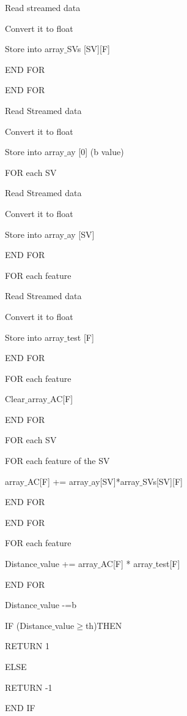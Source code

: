 \documentclass{article}
\begin{document}
\begin{itemize}
\begin{itemize}
        	\quad \quad Read streamed data
        
        	\quad \quad Convert it to float
        
        	\quad \quad Store into array$\_$SVs [SV][F]
        
        	\quad END FOR
        
        END FOR
        
        Read Streamed data
        
        Convert it to float
        
        Store into array$\_$ay [0] (b value)
        
        FOR each SV
        
            \quad Read Streamed data
        
            \quad Convert it to float
        
            \quad Store into array$\_$ay [SV]
        
        END FOR
        
        FOR each feature
        
            \quad Read Streamed data
        
            \quad Convert it to float
        
            \quad Store into array$\_$test [F] 
        
        END FOR
        
        FOR each feature
        
            \quad Clear$\_$array$\_$AC[F]
        
        END FOR
        
        FOR each SV
        
        	 \quad FOR each feature of the SV
        
        	 \quad \quad array$\_$AC[F] += array$\_$ay[SV]*array$\_$SVs[SV][F]
        
        	 \quad   END FOR
        
        END FOR
        
        FOR each feature
        
        	 \quad Distance$\_$value += array$\_$AC[F] * array$\_$test[F]
        
        END FOR
        
        Distance$\_$value -=b
        
        IF (Distance$\_$value$\geq$th)THEN
        
            \quad RETURN 1
        
        ELSE
        
            \quad RETURN -1
        
        END IF
    \end{itemize}
        
\end{itemize}
\end{document}

